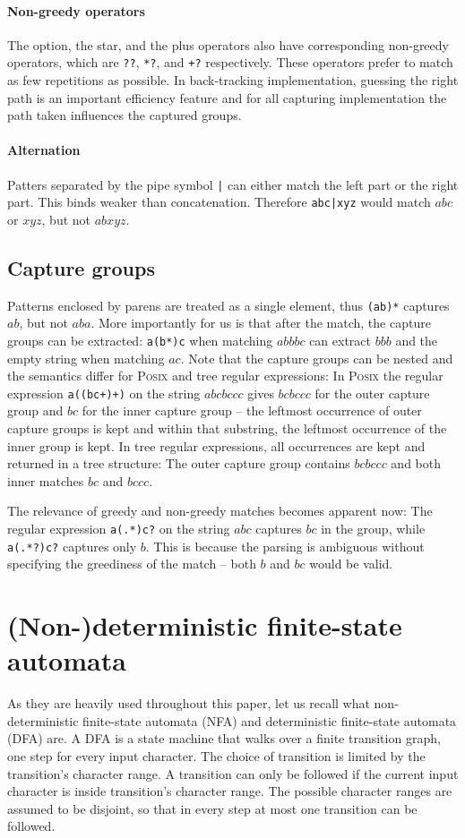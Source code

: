 \documentclass[11pt,a4paper,twoside,openright]{Thesis}
\theoremstyle{definition}
\begin{document}
\paragraph{Non-greedy operators} The option, the star, and the plus operators 
also have corresponding non-greedy operators, which are \texttt{??}, 
\texttt{*?}, and \texttt{+?} respectively. These operators prefer to match as 
few repetitions as possible. In back-tracking implementation, guessing the 
right path is an important efficiency feature and for all capturing 
implementation the path taken influences the captured groups.

\paragraph{Alternation} Patters separated by the pipe symbol \texttt{|} can 
either match the left part or the right part. This binds weaker than 
concatenation. Therefore \texttt{abc|xyz} would match $abc$ or $xyz$, but not
$abxyz$.

\subsection{Capture groups}
Patterns enclosed by parens are treated as a single element, thus
\texttt{(ab)*} captures $ab$, but not $aba$. More importantly for us is that
after the match, the capture groups can be extracted: \texttt{a(b*)c} when
matching $abbbc$ can extract $bbb$ and the empty string when matching $ac$.
Note that the capture groups can be nested and the semantics differ for
\textsc{Posix} and tree regular expressions: In \textsc{Posix} the regular expression
\texttt{a((bc+)+)} on the string $abcbccc$ gives $bcbccc$ for the outer
capture group and $bc$ for the inner capture group -- the leftmost occurrence of
outer capture groups is kept and within that substring, the leftmost occurrence
of the inner group is kept. In tree regular expressions, all occurrences are kept and returned
in a tree structure: The outer capture group contains $bcbccc$ and both inner
matches $bc$ and $bccc$.

The relevance of greedy and non-greedy matches becomes apparent now: The
regular expression \texttt{a(.*)c?} on the string $abc$ captures $bc$ in
the group, while \texttt{a(.*?)c?} captures only $b$. This is because 
the parsing is ambiguous without specifying the greediness of the match -- both
$b$ and $bc$ would be valid.

\section{(Non-)deterministic finite-state automata}
As they are heavily used throughout this paper, let us recall what
non-deterministic finite-state automata (NFA) and deterministic finite-state
automata (DFA) are. A DFA is a state machine that walks over a finite
transition graph, one step for every input character. The choice of transition
is limited by the transition's character range. A transition can only be
followed if the current input character is inside transition's character 
range. The possible character ranges are assumed to be disjoint, so that in 
every step at most one transition can be followed.
\end{document}
